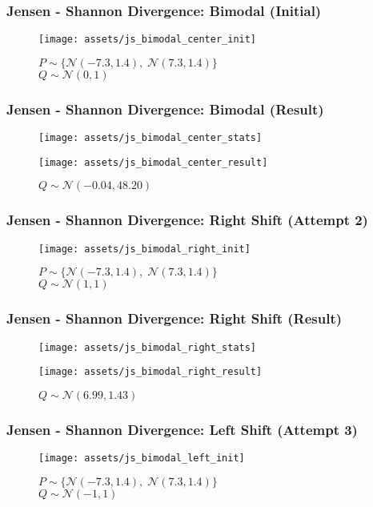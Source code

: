 \documentclass{beamer}
\begin{document}
\begin{frame}
  \frametitle{Jensen - Shannon Divergence: Bimodal (Initial)}
  \begin{figure}
    \centering
    \texttt{[image: assets/js\_bimodal\_center\_init]}
    \caption{$P \sim \big\{\mathcal{N}(-7.3, 1.4), \; \mathcal{N}(7.3, 1.4) \big\}$\\$Q \sim \mathcal{N}(0, 1)$}
  \end{figure}
\end{frame}

\begin{frame}
  \frametitle{Jensen - Shannon Divergence: Bimodal (Result)}
  \begin{figure}
    \centering
    \texttt{[image: assets/js\_bimodal\_center\_stats]}
  \end{figure}
  \begin{figure}
    \centering
    \texttt{[image: assets/js\_bimodal\_center\_result]}
    \caption{$Q \sim \mathcal{N}(-0.04, 48.20)$}
  \end{figure}
\end{frame}


\begin{frame}
  \frametitle{Jensen - Shannon Divergence: Right Shift (Attempt 2)}
  \begin{figure}
    \centering
    \texttt{[image: assets/js\_bimodal\_right\_init]}
    \caption{$P \sim \big\{\mathcal{N}(-7.3, 1.4), \; \mathcal{N}(7.3, 1.4) \big\}$\\$Q \sim \mathcal{N}(1, 1)$}
  \end{figure}
\end{frame}

\begin{frame}
  \frametitle{Jensen - Shannon Divergence: Right Shift (Result)}
  \begin{figure}
    \centering
    \texttt{[image: assets/js\_bimodal\_right\_stats]}
  \end{figure}
  \begin{figure}
    \centering
    \texttt{[image: assets/js\_bimodal\_right\_result]}
    \caption{$Q \sim \mathcal{N}(6.99, 1.43)$}
  \end{figure}
\end{frame}


\begin{frame}
  \frametitle{Jensen - Shannon Divergence: Left Shift (Attempt 3)}
  \begin{figure}
    \centering
    \texttt{[image: assets/js\_bimodal\_left\_init]}
    \caption{$P \sim \big\{\mathcal{N}(-7.3, 1.4), \; \mathcal{N}(7.3, 1.4) \big\}$\\$Q \sim \mathcal{N}(-1, 1)$}
  \end{figure}
\end{frame}
\end{document}
